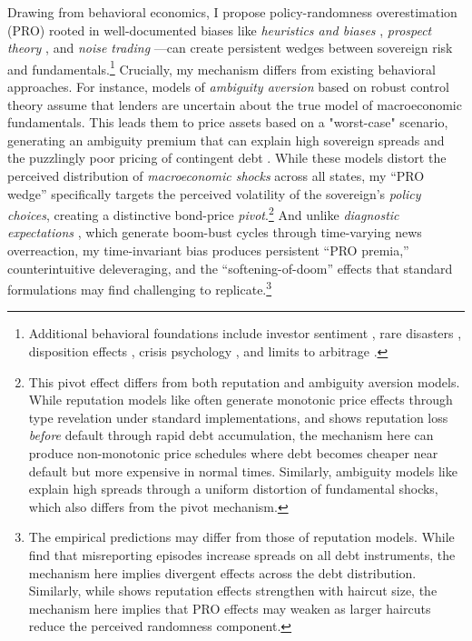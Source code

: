 \documentclass[12pt]{article}
\theoremstyle{plain}
\begin{document}
Drawing from behavioral economics, I propose policy-randomness overestimation
(PRO) rooted in well-documented biases like \textit{heuristics and biases}
\citep{TverskyKahneman1974}, \textit{prospect theory}
\citep{KahnemanTversky1979}, and \textit{noise trading}
\citep{DeLongEtAl1990}---can create persistent wedges between sovereign risk
and fundamentals.\footnote{Additional behavioral foundations include investor
	sentiment \citep{BakerWurgler2006}, rare disasters \citep{Gabaix2012},
	disposition effects \citep{ShefrinStatman1985}, crisis psychology
	\citep{Kindleberger1978}, and limits to arbitrage \citep{BrunnermeierNagel2004,
		BarberisThaler2003}.} Crucially, my mechanism differs from existing behavioral
approaches. For instance, models of \textit{ambiguity aversion} based on robust
control theory \citep{GilboaSchmeidler1989, HansenSargent2008} assume that
lenders are uncertain about the true model of macroeconomic fundamentals. This
leads them to price assets based on a "worst-case" scenario, generating an
ambiguity premium that can explain high sovereign spreads
\citep{PouzoPresno2016} and the puzzlingly poor pricing of contingent debt
\citep{RochRoldan2023}. While these models distort the perceived distribution
of \textit{macroeconomic shocks} across all states, my ``PRO wedge''
specifically targets the perceived volatility of the sovereign's \textit{policy
	choices}, creating a distinctive bond-price \textit{pivot}.\footnote{This pivot
	effect differs from both reputation and ambiguity aversion models. While
	reputation models like \citep{AmadorPhelan2021} often generate monotonic price
	effects through type revelation under standard implementations, and
	\citep{Fourakis2021} shows reputation loss \textit{before} default through
	rapid debt accumulation, the mechanism here can produce non-monotonic price
	schedules where debt becomes cheaper near default but more expensive in normal
	times. Similarly, ambiguity models like \citep{RochRoldan2023} explain high
	spreads through a uniform distortion of fundamental shocks, which also differs
	from the pivot mechanism.} And unlike \textit{diagnostic expectations}
\citep{GennaioliShleifer2018, BordaloEtAl2023}, which generate boom-bust cycles
through time-varying news overreaction, my time-invariant bias produces
persistent ``PRO premia,'' counterintuitive deleveraging, and the
``softening-of-doom'' effects that standard formulations may find challenging
to replicate.\footnote{The empirical predictions may differ from those of
	reputation models. While \citep{MorelliMoretti2023} find that misreporting
	episodes increase spreads on all debt instruments, the mechanism here implies
	divergent effects across the debt distribution. Similarly, while
	\citep{AmadorPhelan2023} shows reputation effects strengthen with haircut size,
	the mechanism here implies that PRO effects may weaken as larger haircuts
	reduce the perceived randomness component.}
\end{document}
